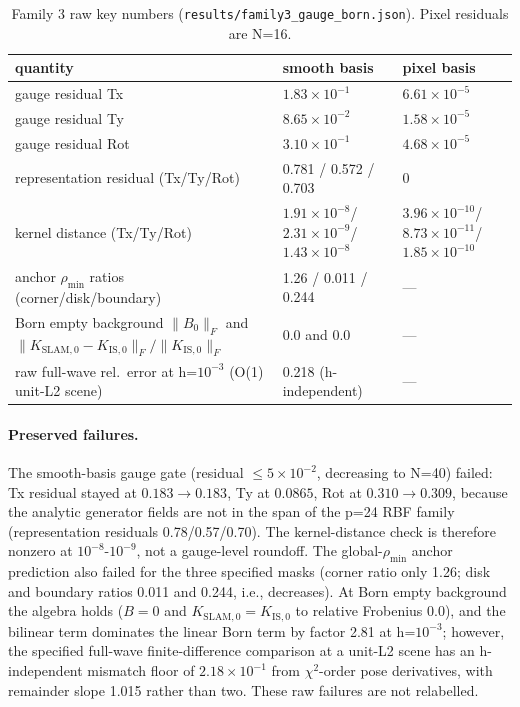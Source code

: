 \documentclass[12pt]{article}
\begin{document}
\begin{table}[ht]
\centering
\small
\caption{Family 3 raw key numbers
(\texttt{results/family3\_gauge\_born.json}). Pixel residuals are N=16.}
\label{tab:f3}
\begin{tabular}{l l l}
\toprule
quantity & smooth basis & pixel basis \\
\midrule
gauge residual Tx & $1.83\times10^{-1}$ & $6.61\times10^{-5}$ \\
gauge residual Ty & $8.65\times10^{-2}$ & $1.58\times10^{-5}$ \\
gauge residual Rot & $3.10\times10^{-1}$ & $4.68\times10^{-5}$ \\
representation residual (Tx/Ty/Rot) &
0.781 / 0.572 / 0.703 & 0 \\
kernel distance (Tx/Ty/Rot) &
$1.91\times10^{-8}$/$2.31\times10^{-9}$/$1.43\times10^{-8}$ &
$3.96\times10^{-10}$/$8.73\times10^{-11}$/$1.85\times10^{-10}$ \\
anchor $\rho_{\min}$ ratios (corner/disk/boundary) &
1.26 / 0.011 / 0.244 & --- \\
Born empty background $\|B_0\|_F$ and
$\|K_{\mathrm{SLAM},0}-K_{\mathrm{IS},0}\|_F/\|K_{\mathrm{IS},0}\|_F$ &
0.0 and 0.0 & --- \\
raw full-wave rel.\ error at h=$10^{-3}$ (O(1) unit-L2 scene) &
0.218 (h-independent) & --- \\
\bottomrule
\end{tabular}
\end{table}

\paragraph{Preserved failures.} The smooth-basis gauge gate
(residual $\le5\times10^{-2}$, decreasing to N=40) failed: Tx residual stayed
at $0.183\to0.183$, Ty at $0.0865$, Rot at $0.310\to0.309$, because the
analytic generator fields are not in the span of the p=24 RBF family
(representation residuals 0.78/0.57/0.70). The kernel-distance check is
therefore nonzero at $10^{-8}$-$10^{-9}$, not a gauge-level roundoff. The
global-$\rho_{\min}$ anchor prediction also failed for the three specified
masks (corner ratio only 1.26; disk and boundary ratios 0.011 and 0.244,
i.e., decreases). At Born empty background the algebra holds ($B=0$ and
$K_{\mathrm{SLAM},0}=K_{\mathrm{IS},0}$ to relative Frobenius 0.0), and the
bilinear term dominates the linear Born term by factor 2.81 at h=$10^{-3}$;
however, the specified full-wave finite-difference comparison at a unit-L2
scene has an h-independent mismatch floor of $2.18\times10^{-1}$ from
$\chi^2$-order pose derivatives, with remainder slope 1.015 rather than two.
These raw failures are not relabelled.
\end{document}
